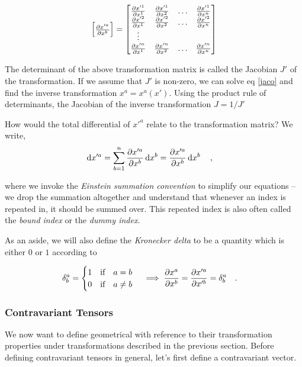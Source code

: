 \documentclass[a4paper,11pt]{article}
\begin{document}
\begin{equation}\label{jaco}
\mqty[\pdv{x'^a}{x^b}] = \mqty[\pdv{x'^1}{x^1} & \pdv{x'^1}{x^2} & \ldots & \pdv{x'^1}{x^n} \\
\pdv{x'^2}{x^1} & \pdv{x'^2}{x^2} & \ldots & \pdv{x'^2}{x^n} \\
\vdots & & & \\
\pdv{x'^n}{x^1} & \pdv{x'^n}{x^2} & \ldots & \pdv{x'^n}{x^n} 
]
\end{equation}

The determinant of the above transformation matrix is called the Jacobian $ J' $ of the transformation. If we assume that $ J' $ is non-zero, we can solve eq \ref{jaco} and find the inverse transformation $ x^a = x^a(x') $. Using the product rule of determinants, the Jacobian of the inverse transformation $ J = 1/J'$ 

How would the total differential of $ x'^a $ relate to the transformation matrix? We write,
\begin{equation}\label{difftransform}
\dd{x'^a} = \sum_{b = 1}^{n} \pdv{x'^a}{x^b} \dd{x^b} = \pdv{x'^a}{x^b} \dd{x^b}  \qq{,}
\end{equation}

where we invoke the \textit{Einstein summation convention} to simplify our equations -- we drop the summation altogether and understand that whenever an index is repeated in, it should be summed over. This repeated index is also often called the \textit{bound index} or the \textit{dummy index}.

As an aside, we will also define the \textit{Kronecker delta} to be a quantity which is either $ 0 $ or $ 1 $ according to

\begin{equation}\label{key}
\delta^a_b = \begin{cases}
1 \qq{if} a = b\\
0 \qq{if} a \ne b
\end{cases} \implies \pdv{x^a}{x^b} = \pdv{x'^a}{x'^b} = \delta^a_b \qq{.}
\end{equation}

\subsubsection{Contravariant Tensors}
We now want to define geometrical with reference to their transformation properties under transformations described in the previous section. Before defining contravariant tensors in general, let's first define a contravariant vector.
\end{document}
